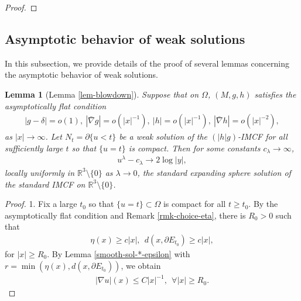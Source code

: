 \documentclass[11pt, letterpaper]{amsart}
\newtheorem{lem}[thm]{Lemma}
\theoremstyle{definition}
\theoremstyle{remark}
\begin{document}
\begin{appendix}
\begin{proof}
 
\end{proof}

\subsection{Asymptotic behavior of weak solutions}\label{appen-asymptotic}
In this subsection, we provide details of the proof of several lemmas concerning the asymptotic behavior of weak solutions.

\begin{lem}[Lemma \ref{lem-blowdown}]
	Suppose that on $\Omega $, $(M, g, h)$ satisfies the asymptotically flat condition
	\begin{align*}
		|g - \delta | = o(1),\ |\bar{\nabla }g| = o (|x| ^{-1}), \ |h| = o(|x| ^{-1}),\ |\bar{\nabla }h| = o(|x| ^{-2}),
	\end{align*} 
	as $|x| \to \infty$. Let $N_t = \partial \{ u< t\} $ be a weak solution of the $(|h| g)$-IMCF for all sufficiently large $t$ so that $\{u=t\} $ is compact. Then for some constants $c_{\lambda } \to \infty$,
	\begin{align*}
		u ^{\lambda } - c_{\lambda } \to 2 \log |y|,
	\end{align*} 
	locally uniformly in $\mathbb{R}^{3} \setminus \{ 0\} $ as $\lambda \to 0$, the standard expanding sphere solution of the standard IMCF on $\mathbb{R}^{3} \setminus \{0\} $.
\end{lem}

\begin{proof}
	1.  Fix a large $t_0$ so that $\{ u = t\}  \subset \Omega $ is compact for all $t \geq t_0$. By the asymptotically flat condition and Remark \ref{rmk-choice-eta}, there is $R_0>0$ such that 
	\begin{align*}
		\eta (x) \geq c|x|,\ \ d(x, \partial E_{t_0}) \geq c |x|,
	\end{align*} 
	for $|x| \geq R_0$. By Lemma \ref{smooth-sol-*-epsilon} with $r = \min(\eta (x), d(x, \partial E_{t_0}) )$, we obtain
	\begin{align}\label{gradient-decay}
		|\nabla u| (x) \leq C |x| ^{-1}, \ \ \forall |x| \geq R_0.
	\end{align}


\end{proof}
\end{appendix}
\end{document}

